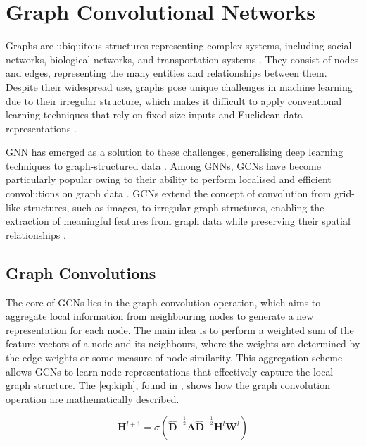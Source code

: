 
\section{Graph Convolutional Networks}

Graphs are ubiquitous structures representing complex systems, including social networks, biological networks, and transportation systems \autocite{scarselli2008graph}. They consist of nodes and edges, representing the many entities and relationships between them. Despite their widespread use, graphs pose unique challenges in machine learning due to their irregular structure, which makes it difficult to apply conventional learning techniques that rely on fixed-size inputs and Euclidean data representations \autocite{battaglia2018relational}.

\Gls{GNN} has emerged as a solution to these challenges, generalising deep learning techniques to graph-structured data \autocite{gori2005new}. Among \glspl{GNN}, \glspl{GCN} have become particularly popular owing to their ability to perform localised and efficient convolutions on graph data \autocite{DBLP:journals/corr/KipfW16}. \glspl{GCN} extend the concept of convolution from grid-like structures, such as images, to irregular graph structures, enabling the extraction of meaningful features from graph data while preserving their spatial relationships \autocite{bronstein2017geometric}. 

\subsection{Graph Convolutions}
The core of \glspl{GCN} lies in the graph convolution operation, which aims to aggregate local information from neighbouring nodes to generate a new representation for each node. The main idea is to perform a weighted sum of the feature vectors of a node and its neighbours, where the weights are determined by the edge weights or some measure of node similarity. This aggregation scheme allows \glspl{GCN} to learn node representations that effectively capture the local graph structure. The \cref{eq:kiph}, found in \autocite{DBLP:journals/corr/KipfW16}, shows how the graph convolution operation are mathematically described.

\begin{equation*} 
    \bm{H}^{l+1} = \sigma(\bm{\hat{D}}^{-\frac{1}{2}} \bm{A} \bm{\hat{D}}^{-\frac{1}{2}} \bm{H}^{l} \bm{W}^{l} )
    \label{eq:kiph}
\end{equation*}


